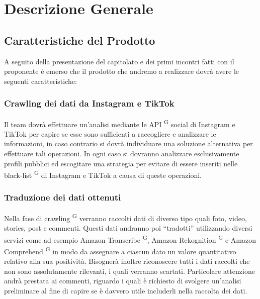 \section{Descrizione Generale}

\subsection{Caratteristiche del Prodotto}

A seguito della presentazione del capitolato e dei primi incontri fatti con il proponente è emerso che il prodotto che andremo a realizzare dovrà avere le seguenti caratteristiche:

\subsubsection{Crawling dei dati da Instagram e TikTok}
Il team dovrà effettuare un’analisi mediante le API \textsuperscript{G} social di Instagram e TikTok per capire se esse sono sufficienti a raccogliere e analizzare le informazioni, in caso contrario si dovrà individuare una soluzione alternativa per effettuare tali operazioni. In ogni caso si dovranno analizzare esclusivamente profili pubblici ed escogitare una strategia per evitare di essere inseriti nelle black-list \textsuperscript{G} di Instagram e TikTok a causa di queste operazioni.

\subsubsection{Traduzione dei dati ottenuti}
Nella fase di crawling \textsuperscript{G} verranno raccolti dati di diverso tipo quali foto, video, stories, post e commenti. Questi dati andranno poi “tradotti” utilizzando diversi servizi come ad esempio Amazon Transcribe \textsuperscript{G}, Amazon Rekognition \textsuperscript{G} e Amazon Comprehend \textsuperscript{G} in modo da assegnare a ciascun dato un valore quantitativo relativo alla sua positività. Bisognerà inoltre riconoscere tutti i dati raccolti che non sono assolutamente rilevanti, i quali verranno scartati. Particolare attenzione andrà prestata ai commenti, riguardo i quali è richiesto di svolgere un’analisi preliminare al fine di capire se è davvero utile includerli nella raccolta dei dati.

